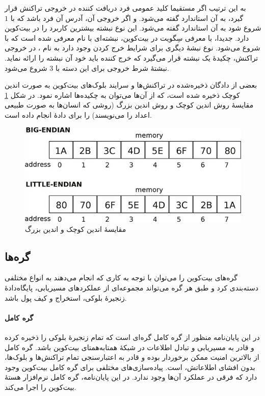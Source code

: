 به این ترتیب اگر مستقیما کلید عمومی فرد دریافت کننده در خروجی تراکنش قرار گیرد، به آن استاندارد
 گفته می‌شود. و اگر خروجی آن، آدرس آن فرد باشد که با $1$ شروع شود به آن استاندارد 
گفته می‌شود. این نوع نبشته بیشترین کاربرد را در بیت‌کوین دارد. جدیدا، با معرفی سِگویت در بیت‌کوین، نبشته‌ای با نام 
معرفی شده است که با  شروع می‌شود. نوع نبشه‌ٔ دیگری برای شرایط خرج کردن وجود دارد به نام 
، در خروجی تراکنش، چکیدهٔ یک نبشته قرار می‌گیرد که خرج کننده باید خود آن نبشته‌ را ارائه نماید. نبشتهٔ شرط خروجی برای این دسته با $3$ شروع می‌شود.

بعضی از دادگان ذخیره‌شده در تراکنش‌ها و سرایند بلوک‌های بیت‌کوین به صورت 
اندین کوچک
ذخیره شده است، که از آن‌ها می‌توان به چکیده‌ها اشاره نمود. در شکل \ref{fig:endian} مقایسهٔ روش اندین کوچک و روش اندین بزرگ  (روشی که انسان‌ها به صورت طبیعی اعداد را می‌نویسند) را برای دادهٔ  انجام داده است.

\begin{figure}[h]
	\centering
	\includegraphics[width=0.7\linewidth]{image/endian}
	\caption{مقایسهٔ اندین کوچک و اندین بزرگ\cite{Grochowski2020}}
	\label{fig:endian}
\end{figure}


\subsection{گره‌ها‌}
گره‌‌های بیت‌کوین را می‌توان با توجه به کاری که انجام می‌دهند به انواع مختلفی دسته‌بندی کرد و طبق \cite{Antonopoulos2016} هر گره می‌تواند مجموعه‌ای از عملکرد‌های مسیریابی، پایگاه‌دادهٔ زنجیره‌ٔ بلوکی، استخراج و کیف پول باشد.
\paragraph{گره کامل}
در این پایان‌نامه منظور از گره کامل گره‌ای است که تمام زنجیرهٔ بلوکی را ذخیره کرده و قادر به مسیریابی و تبادل اطلاعات در شبکهٔ همتا‌به‌همتای بیت‌کوین باشد. گره کامل از بالاترین امنیت ممکن برخوردار بوده و قادر به اعتبارسنجی تمام تراکنش‌ها و بلوک‌ها، بدون افشای اطلاعاتش، است. پیاده‌سازی‌های مختلفی برای گره کامل بیت‌کوین وجود دارد که فرقی در عملکرد آن‌ها وجود ندارد. در این پایان‌نامه، گره کامل نرم‌افزار هستهٔ بیت‌کوین\cite{Bitcoincore.org} را اجرا می‌کند.

